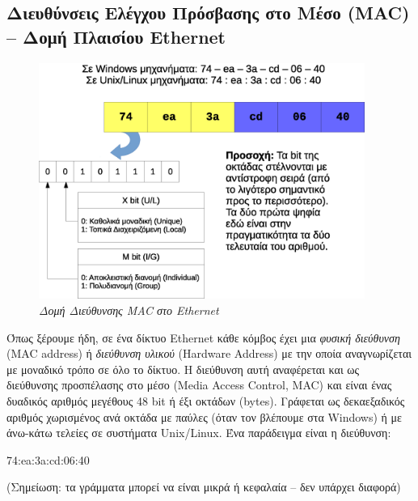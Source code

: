 %
%

\setcounter{subsection}{1}
\subsection{Διευθύνσεις Ελέγχου Πρόσβασης στο Μέσο (MAC) -- Δομή Πλαισίου Ethernet}

\begin{figure}[!ht]
  \centering
  \includegraphics[width=0.95\textwidth]{images/chapter2/2-3}
  \caption {\textsl{Δομή Διεύθυνσης MAC στο Ethernet}}
  \label{2-3}
\end{figure}

Όπως ξέρουμε ήδη, σε ένα δίκτυο Ethernet κάθε κόμβος έχει μια \emph{φυσική διεύθυνση} (MAC address) ή \emph{διεύθυνση υλικού} (Hardware Address) με την οποία αναγνωρίζεται με μοναδικό τρόπο σε όλο το δίκτυο. Η διεύθυνση αυτή αναφέρεται και ως διεύθυνσης προσπέλασης στο μέσο (Media Access Control, MAC) και είναι ένας δυαδικός αριθμός μεγέθους 48 bit ή έξι οκτάδων (bytes).
Γράφεται ως δεκαεξαδικός αριθμός χωρισμένος ανά οκτάδα με παύλες (όταν τον βλέπουμε στα Windows) ή με άνω-κάτω τελείες σε συστήματα Unix/Linux. Ένα παράδειγμα είναι η διεύθυνση:

74:ea:3a:cd:06:40

(Σημείωση: τα γράμματα μπορεί να είναι μικρά ή κεφαλαία -- δεν υπάρχει διαφορά)

